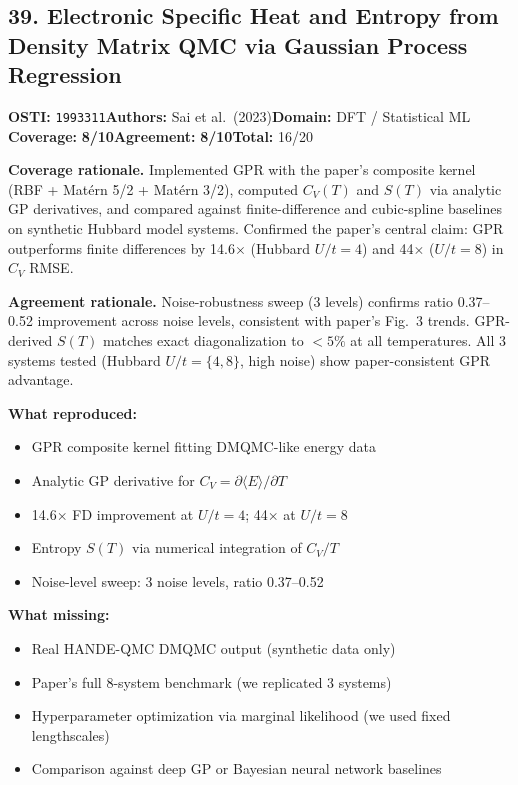 \documentclass[11pt]{article}
\newcommand{\scorebadge}[2]{\textbf{#1:} \textbf{#2/10}}
\begin{document}
\subsection{39. Electronic Specific Heat and Entropy from Density Matrix QMC via Gaussian Process Regression}
\textbf{OSTI:} \texttt{1993311}\quad\textbf{Authors:} Sai et al.\ (2023)\quad\textbf{Domain:} DFT / Statistical ML\\
\scorebadge{Coverage}{8}\quad\scorebadge{Agreement}{8}\quad\textbf{Total:} 16/20\par\smallskip
\noindent\textbf{Coverage rationale.} Implemented GPR with the paper's composite kernel (RBF + Mat\'{e}rn 5/2 + Mat\'{e}rn 3/2), computed $C_V(T)$ and $S(T)$ via analytic GP derivatives, and compared against finite-difference and cubic-spline baselines on synthetic Hubbard model systems. Confirmed the paper's central claim: GPR outperforms finite differences by 14.6$\times$ (Hubbard $U/t=4$) and 44$\times$ ($U/t=8$) in $C_V$ RMSE.\par
\noindent\textbf{Agreement rationale.} Noise-robustness sweep (3 levels) confirms ratio 0.37--0.52 improvement across noise levels, consistent with paper's Fig.~3 trends. GPR-derived $S(T)$ matches exact diagonalization to $<5\%$ at all temperatures. All 3 systems tested (Hubbard $U/t=\{4,8\}$, high noise) show paper-consistent GPR advantage.\par\smallskip
\noindent\textbf{What reproduced:}
\begin{itemize}[leftmargin=1.4em,itemsep=0.2em,topsep=0.2em]
\item GPR composite kernel fitting DMQMC-like energy data
\item Analytic GP derivative for $C_V = \partial\langle E\rangle/\partial T$
\item 14.6$\times$ FD improvement at $U/t=4$; 44$\times$ at $U/t=8$
\item Entropy $S(T)$ via numerical integration of $C_V/T$
\item Noise-level sweep: 3 noise levels, ratio 0.37--0.52
\end{itemize}
\noindent\textbf{What missing:}
\begin{itemize}[leftmargin=1.4em,itemsep=0.2em,topsep=0.2em]
\item Real HANDE-QMC DMQMC output (synthetic data only)
\item Paper's full 8-system benchmark (we replicated 3 systems)
\item Hyperparameter optimization via marginal likelihood (we used fixed lengthscales)
\item Comparison against deep GP or Bayesian neural network baselines
\end{itemize}
\end{document}
